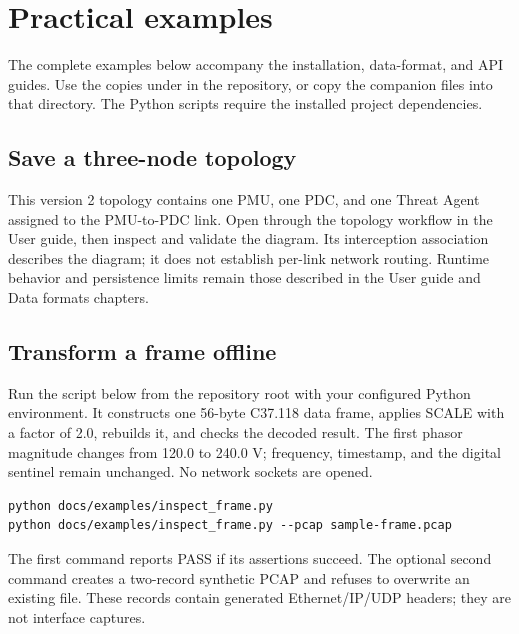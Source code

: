 \chapter{Practical examples}\label{practical-examples}
The complete examples below accompany the installation, data-format, and API guides. Use the copies under  in the repository, or copy the companion files into that directory. The Python scripts require the installed project dependencies.

\section*{Save a three-node topology}
This version 2 topology contains one PMU, one PDC, and one Threat Agent assigned to the PMU-to-PDC link. Open  through the topology workflow in the User guide, then inspect and validate the diagram. Its interception association describes the diagram; it does not establish per-link network routing. Runtime behavior and persistence limits remain those described in the User guide and Data formats chapters.



\section*{Transform a frame offline}
Run the script below from the repository root with your configured Python environment. It constructs one 56-byte C37.118 data frame, applies SCALE with a factor of 2.0, rebuilds it, and checks the decoded result. The first phasor magnitude changes from 120.0 to 240.0 V; frequency, timestamp, and the digital sentinel remain unchanged. No network sockets are opened.

\begin{lstlisting}[title={Commands}]
python docs/examples/inspect_frame.py
python docs/examples/inspect_frame.py --pcap sample-frame.pcap
\end{lstlisting}
The first command reports PASS if its assertions succeed. The optional second command creates a two-record synthetic PCAP and refuses to overwrite an existing file. These records contain generated Ethernet/IP/UDP headers; they are not interface captures.

